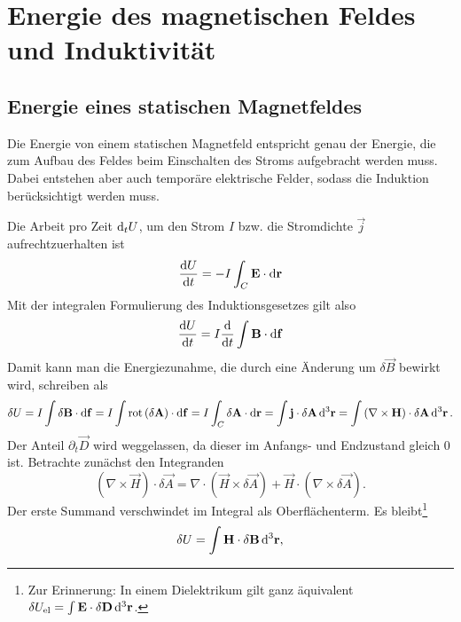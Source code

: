 \section{Energie des magnetischen Feldes und Induktivität}

\subsection{Energie eines statischen Magnetfeldes}

Die Energie von einem statischen Magnetfeld entspricht genau der Energie, die zum Aufbau des Feldes beim Einschalten des Stroms aufgebracht werden muss. Dabei entstehen aber auch temporäre elektrische Felder, sodass die Induktion berücksichtigt werden muss.

Die Arbeit pro Zeit $\diff _{t}U$, um den Strom $I$ bzw. die Stromdichte $\vec {j}$ aufrechtzuerhalten ist
\begin{equation*}
	\frac{\diff U}{\diff t}=-I\int _{C}\vec {E}\cdot \diff \vec {r}
\end{equation*}
Mit der integralen Formulierung des Induktionsgesetzes gilt also
\begin{equation*}
	\frac{\diff U}{\diff t}=I\frac{\diff }{\diff t}\int \vec {B}\cdot \diff \vec {f}
\end{equation*}
Damit kann man die Energiezunahme, die durch eine Änderung um $\delta \vec {B}$ bewirkt wird, schreiben als
\begin{equation*}
	\delta U=I\int \delta \vec {B}\cdot \diff \vec {f}=I\int \rot \left(\delta \vec {A}\right)\cdot \diff \vec {f}=I\int _{C}\delta \vec {A}\cdot \diff \vec {r}=\int \vec {j}\cdot \delta \vec {A}\diffa[3]{\vec{r}}=\int \left(\nabla \times \vec {H}\right)\cdot \delta \vec {A}\diffa[3]{\vec{r}}.
\end{equation*}
Der Anteil $\partial _{t}\vec {D}$ wird weggelassen, da dieser im Anfangs- und Endzustand gleich $0$ ist. Betrachte zunächst den Integranden
\begin{equation*}
	\left(\nabla \times \vec {H}\right)\cdot \delta \vec {A}=\nabla \cdot \left(\vec {H}\times \delta \vec {A}\right)+\vec {H}\cdot \left(\nabla \times \delta \vec {A}\right).
\end{equation*}
Der erste Summand verschwindet im Integral als Oberflächenterm. Es bleibt\footnote{Zur Erinnerung: In einem Dielektrikum gilt ganz äquivalent $\delta U_{\mathrm{el}}=\int \vec {E}\cdot \delta \vec {D}\diffa[3]{\vec{r}}$. }
\begin{equation*}
	\delta U=\int \vec {H}\cdot \delta \vec {B}\diffa[3]{\vec{r}},
\end{equation*}

